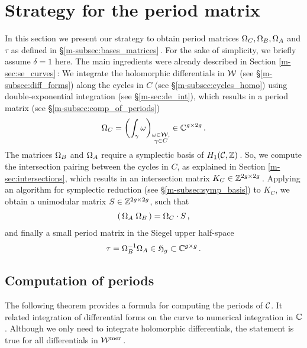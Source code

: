 \documentclass[main.tex]{subfiles}
\begin{document}
  \section{Strategy for the period matrix}

  In this section we present our strategy to obtain period matrices $\Omega_C, \Omega_B, \Omega_A$ and $\tau$ as defined in \S \ref{m-subsec:bases_matrices}\,. For the sake
  of simplicity,  we briefly assume $\delta = 1$ here. The main ingredients were already described in
  Section \ref{m-sec:se_curves}\,: \abstand We integrate the holomorphic differentials in $\mathcal{W}$ (see \S \ref{m-subsec:diff_forms})
  along the cycles in $C$ (see  \S \ref{m-subsec:cycles_homo}) using double-exponential integration (see \S \ref{m-sec:de_int}), which results in a period matrix (see \S \ref{m-subsec:comp_of_periods})
  \begin{align}
    \Omega_C = \left( \int_{\gamma} \omega \right)_{\substack{\omega \in \mathcal{W}, \\ \gamma \in C}} \in \mathbb{C}^{g \times 2g}\,.
  \end{align}
  The matrices $\Omega_B$ and $\Omega_A$ require a symplectic basis of $H_1(\mathcal{C},\mathbb{Z})$\,.
  So, we compute the intersection pairing between the cycles in $C$, as explained in Section \ref{m-sec:intersections}, which results in an
  intersection matrix $K_C \in \mathbb{Z}^{2g \times 2g}$\,. \abstand
  Applying an algorithm for symplectic reduction (see \S \ref{m-subsec:symp_basis}) to $K_C$, we obtain a unimodular matrix $S \in \mathbb{Z}^{2g \times 2g}$, such that
  \begin{align}
   ( \, \Omega_A \; \Omega_B \, ) = \Omega_C \cdot S\,,
   \end{align}
   and finally a small period matrix in the Siegel upper half-space
   \begin{align}
   \tau = \Omega_B^{-1} \Omega_A \in \mathfrak{H}_g \subset \mathbb{C}^{g \times g}\,.
  \end{align}
  
  \bigskip
  
  \subsection{Computation of periods}\label{subsec:comp_of_periods}
  
  The following theorem provides a formula for computing the periods of $\mathcal{C}$. It related integration of differential forms on the curve to numerical integration in $\mathbb{C}$.
  Although we only need to integrate holomorphic
  differentials, the statement is true for all differentials in $\mathcal{W}^{\text{mer}}$\,.
  
\end{document}
